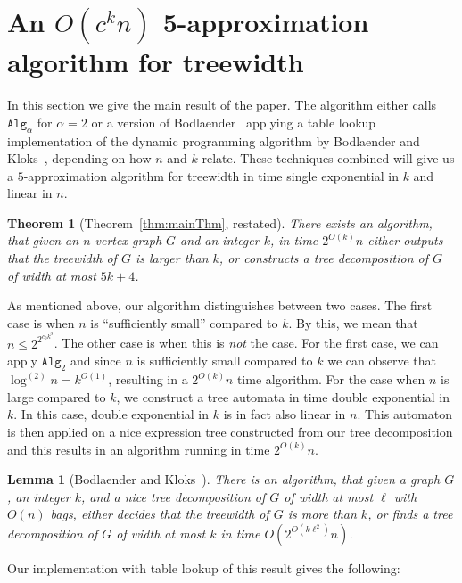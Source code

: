 \documentclass[a4paper,11pt]{article}
\newtheorem{theorem}{Theorem}
\newtheorem{lemma}{Lemma}[section]
\theoremstyle{definition}
\theoremstyle{remark}
\newcommand{\depth}{\alpha}
\newcommand{\alg}[1]{\mathtt{Alg}_{#1}}
\begin{document}
\section{An $O(c^k n)$ 5-approximation algorithm for treewidth}
\label{section:linear}
In this section we give the main result of the paper.  The algorithm
either calls $\alg{\depth}$ for $\depth = 2$ or a version of
Bodlaender~\cite{Bodlaender96} applying a table lookup implementation
of the dynamic programming algorithm by Bodlaender and
Kloks~\cite{BodlaenderK96}, depending on how $n$ and $k$ relate.
These techniques combined will give us a $5$-approximation algorithm
for treewidth in time single exponential in $k$ and linear in $n$.

\begin{theorem}[Theorem~\ref{thm:mainThm}, restated]
  There exists an algorithm, that given an $n$-vertex graph $G$ and an
  integer $k$, in time $2^{O(k)} n$ either outputs that the treewidth
  of $G$ is larger than $k$, or constructs a tree decomposition of $G$
  of width at most $5k + 4$.
\end{theorem}



As mentioned above, our algorithm distinguishes between two cases.
The first case is when $n$ is ``sufficiently small'' compared to $k$.
By this, we mean that $n \leq 2^{2^{c_0 k^3}}$.  The other case is
when this is \emph{not} the case.  For the first case, we can apply
$\alg{2}$ and since $n$ is sufficiently small compared to $k$ we can
observe that $\log^{(2)}n= k^{O(1)}$, resulting in a $2^{O(k)}n$ time
algorithm.  For the case when $n$ is large compared to $k$, we
construct a tree automata in time double exponential in $k$.  In this
case, double exponential in $k$ is in fact also linear in $n$.  This
automaton is then applied on a nice expression tree constructed from
our tree decomposition and this results in an algorithm running in
time $2^{O(k)}n$.

\begin{lemma}[Bodlaender and Kloks~\cite{BodlaenderK96}]
  There is an algorithm, that given a graph $G$, an integer $k$, and a
  nice tree decomposition of $G$ of width at most $\ell$ with $O(n)$
  bags, either decides that the treewidth of $G$ is more than $k$, or
  finds a tree decomposition of $G$ of width at most $k$ in time
  $O(2^{O(k \ell^2)} n )$.
  \label{lemma:BodlaenderKloks}
\end{lemma}

Our implementation with table lookup of this result gives the
following:
\end{document}
